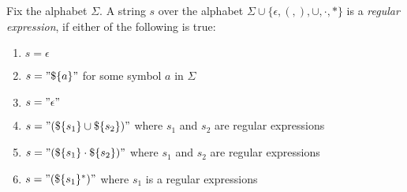 \documentclass[11pt]{article}
\begin{document}
\begin{definition} \label{def:def19}
Fix the alphabet $\Sigma$. A string $s$ over the alphabet
$\Sigma \cup \{\epsilon,(,),\cup,\cdot,\ast\}$ is a \emph{regular
expression}, if either of the following is true:
\begin{enumerate}
\item $s = \epsilon$
\item $s = "\$\{a\}"$ for some symbol $a$ in $\Sigma$
\item $s = "\epsilon"$
\item $s = "(\$\{s_1\} \cup \$\{s_2\})"$ where $s_1$ and $s_2$ are regular
expressions
\item $s = "(\$\{s_1\} \cdot \$\{s_2\})"$ where $s_1$ and $s_2$ are regular
expressions
\item $s = "(\$\{s_1\}^\ast)"$ where $s_1$ is a regular expressions
\end{enumerate}
\end{definition}
\end{document}
